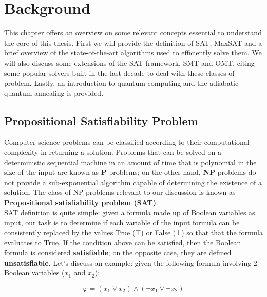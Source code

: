 \chapter{Background}
\label{cha:introQA}

This chapter offers an overview on some relevant concepts essential to understand the core of this thesis. First we will provide the definition of SAT, MaxSAT and a brief overview of the state-of-the-art algorithms used to efficiently solve them. We will also discuss some extensions of the SAT framework, SMT and OMT, citing some popular solvers built in the last decade to deal with these classes of problem. Lastly, an introduction to quantum computing and the adiabatic quantum annealing is provided.

\section{Propositional Satisfiability Problem}
\label{sec:sat}

Computer science problems can be classified according to their computational complexity in returning a solution. Problems that can be solved on a deterministic sequential machine in an amount of time that is polynomial in the size of the input are known as \textbf{P} problems; on the other hand, \textbf{NP} problems do not provide a sub-exponential algorithm capable of determining the existence of a solution. The class of NP problems relevant to our discussion is known as \textbf{Propositional satisfiability problem (SAT)}. \\
SAT definition is quite simple: given a formula made up of Boolean variables as input, our task is to determine if each variable of the input formula can be consistently replaced by the values True ($\top$) or False ($\bot$) so that that the formula evaluates to True. If the condition above can be satisfied, then the Boolean formula is considered \textbf{satisfiable}; on the opposite case, they are defined \textbf{unsatisfiable}. Let's discuss an example: given the following formula involving 2 Boolean variables ($x_1$ and $x_2$):

\begin{equation}
    \varphi = ( x_1 \vee x_2) \wedge (\neg x_1 \vee \neg x_2)
\end{equation}


